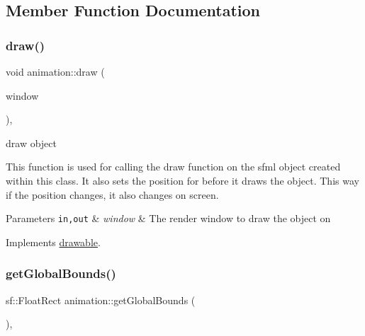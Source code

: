 \subsection{Member Function Documentation}
\mbox{\label{classanimation_a20959b66d1c25007890bb40f0e876570}} 
\subsubsection{\texorpdfstring{draw()}{draw()}}
{\footnotesize\ttfamily void animation\+::draw (\begin{DoxyParamCaption}\item[{sf\+::\+Render\+Window \&}]{window }\end{DoxyParamCaption})\hspace{0.3cm}{\ttfamily [override]}, {\ttfamily [virtual]}}



draw object 

This function is used for calling the draw function on the sfml object created within this class. It also sets the position for before it draws the object. This way if the position changes, it also changes on screen.


\begin{DoxyParams}[1]{Parameters}
\mbox{\tt in,out}  & {\em window} & The render window to draw the object on \\
\hline
\end{DoxyParams}


Implements \hyperlink{classdrawable_a4e49e2c1121704c83ce24c5f48dd910f}{drawable}.

\mbox{\label{classanimation_aae3322323bf3dea83723969f364e18e0}} 
\subsubsection{\texorpdfstring{get\+Global\+Bounds()}{getGlobalBounds()}}
{\footnotesize\ttfamily sf\+::\+Float\+Rect animation\+::get\+Global\+Bounds (\begin{DoxyParamCaption}{ }\end{DoxyParamCaption})\hspace{0.3cm}{\ttfamily [override]}, {\ttfamily [virtual]}}



